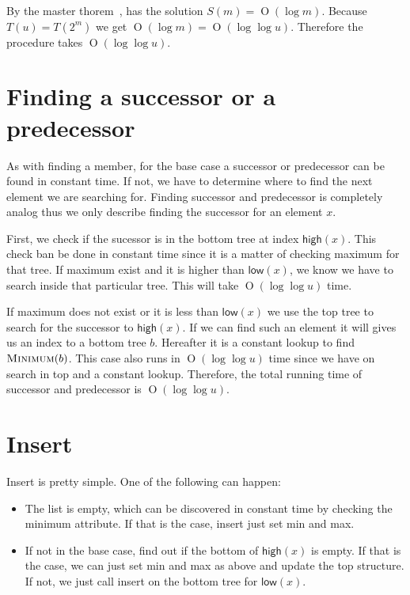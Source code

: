 \documentclass[oneside,11pt,openright]{report}
\newcommand{\BigO}[1]{\ensuremath{\operatorname{O}\left(#1\right)}}
\newcommand{\Minimum}{\textsc{Minimum}}
\newcommand{\HIGH}{\textsf{high}}
\newcommand{\LOW}{\textsf{low}}
\begin{document}
By the master thorem~\cite[p. 93]{ITA09}, has the solution $S(m) = \BigO{\log m}$. Because $T(u) = T(2^m)$ we get $\BigO{\log m} = \BigO{\log \log u}$. Therefore the procedure takes $\BigO{\log \log u}$.

\section{Finding a successor or a predecessor}

As with finding a member, for the base case a successor or predecessor can be found in constant time. If not, we have to determine where to find the next element we are searching for. Finding successor and predecessor is completely analog thus we only describe finding the successor for an element $x$.

First, we check if the sucessor is in the bottom tree at index $\HIGH(x)$. This check ban be done in constant time since it is a matter of checking maximum for that tree. If maximum exist and it is higher than $\LOW(x)$, we know we have to search inside that particular tree. This will take $\BigO{\log\log u}$ time.

If maximum does not exist or it is less than $\LOW(x)$ we use the top tree to search for the successor to $\HIGH(x)$. If we can find such an element it will gives us an index to a bottom tree $b$. Hereafter it is a constant lookup to find $\Minimum(b)$. This case also runs in $\BigO{\log\log u}$ time since we have on search in top and a constant lookup. Therefore, the total running time of successor and predecessor is $\BigO{\log\log u}$.

\section{Insert}

Insert is pretty simple. One of the following can happen:

\begin{itemize}
\item The list is empty, which can be discovered in constant time by checking the minimum attribute. If that is the case, insert just set min and max.
\item If not in the base case, find out if the bottom of $\HIGH(x)$ is empty. If that is the case, we can just set min and max as above and update the top structure. If not, we just call insert on the bottom tree for $\LOW(x)$.
\end{itemize}
\end{document}
